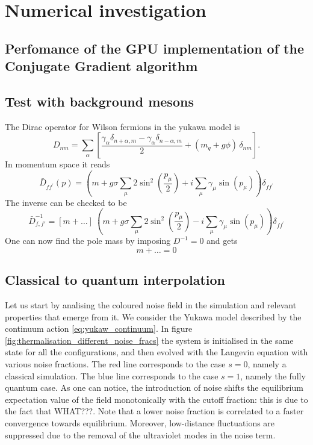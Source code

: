 \chapter{Numerical investigation}
\label{chapt:results}

\section{Perfomance of the GPU implementation of the Conjugate Gradient algorithm}

\section{Test with background mesons}

The Dirac operator for Wilson fermions in the yukawa model is
\begin{equation*}
D_{n m}=\sum_\alpha\left[\frac{\gamma_\alpha \delta_{n+\alpha, m} - \gamma_\alpha \delta_{n-\alpha, m}}{2} + (m_q + g \phi) \, \delta_{n m}\right] .
\end{equation*}
In momentum space it reads
\begin{equation*}
\bar{D}_{f f^{\prime}}(p)=\left(m+ g \sigma \sum_\mu 2 \sin ^2\left(\frac{p_\mu}{2}\right)+i \sum_\mu \gamma_\mu \sin \left(p_\mu\right)\right) \delta_{f f^{\prime}}
\end{equation*}
The inverse can be checked to be 
\begin{equation*}
    \bar D_{f,f'} ^{-1} = \left[m + \dots\right] \ \left(m+ g \sigma \sum_\mu 2 \sin ^2\left(\frac{p_\mu}{2}\right) - i \sum_\mu \gamma_\mu \sin \left(p_\mu\right)\right) \delta_{f f^{\prime}}
\end{equation*}
One can now find the pole mass by imposing $D^{-1} = 0$ and gets 
\begin{equation*}
    m + \dots = 0
\end{equation*}

\section{Classical to quantum interpolation}
\label{sec:classical_to_quantum}

Let us start by analising the coloured noise field in the simulation and relevant properties that emerge from it. We consider the Yukawa model described by the continuum action \ref{eq:yukaw_continuum}.
In figure \ref{fig:thermalisation_different_noise_fracs} the system is initialised in the same state for all the configurations, and then evolved with the Langevin equation with various noise fractions. The red line corresponds to the case $s=0$, namely a classical simulation. The blue line corresponds to the case $s=1$, namely the fully quantum case. As one can notice, the introduction of noise shifts the equilibrium expectation value of the field monotonically with the cutoff fraction: this is due to the fact that WHAT???. Note that a lower noise fraction is correlated to a faster convergence towards equilibrium. Moreover, low-distance fluctuations are suppressed due to the removal of the ultraviolet modes in the noise term.

